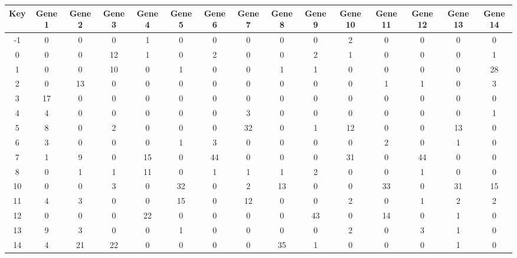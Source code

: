 \begin{tabular}{|c|c|c|c|c|c|c|c|c|c|c|c|c|c|c|}
\hline
Key & Gene 1 & Gene 2 & Gene 3 & Gene 4 & Gene 5 & Gene 6 & Gene 7 & Gene 8 & Gene 9 & Gene 10 & Gene 11 & Gene 12 & Gene 13 & Gene 14 \\
\hline
-1 & 0 & 0 & 0 & 1 & 0 & 0 & 0 & 0 & 0 & 2 & 0 & 0 & 0 & 0 \\
0 & 0 & 0 & 12 & 1 & 0 & 2 & 0 & 0 & 2 & 1 & 0 & 0 & 0 & 1 \\
1 & 0 & 0 & 10 & 0 & 1 & 0 & 0 & 1 & 1 & 0 & 0 & 0 & 0 & 28 \\
2 & 0 & 13 & 0 & 0 & 0 & 0 & 0 & 0 & 0 & 0 & 1 & 1 & 0 & 3 \\
3 & 17 & 0 & 0 & 0 & 0 & 0 & 0 & 0 & 0 & 0 & 0 & 0 & 0 & 0 \\
4 & 4 & 0 & 0 & 0 & 0 & 0 & 3 & 0 & 0 & 0 & 0 & 0 & 0 & 1 \\
5 & 8 & 0 & 2 & 0 & 0 & 0 & 32 & 0 & 1 & 12 & 0 & 0 & 13 & 0 \\
6 & 3 & 0 & 0 & 0 & 1 & 3 & 0 & 0 & 0 & 0 & 2 & 0 & 1 & 0 \\
7 & 1 & 9 & 0 & 15 & 0 & 44 & 0 & 0 & 0 & 31 & 0 & 44 & 0 & 0 \\
8 & 0 & 1 & 1 & 11 & 0 & 1 & 1 & 1 & 2 & 0 & 0 & 1 & 0 & 0 \\
10 & 0 & 0 & 3 & 0 & 32 & 0 & 2 & 13 & 0 & 0 & 33 & 0 & 31 & 15 \\
11 & 4 & 3 & 0 & 0 & 15 & 0 & 12 & 0 & 0 & 2 & 0 & 1 & 2 & 2 \\
12 & 0 & 0 & 0 & 22 & 0 & 0 & 0 & 0 & 43 & 0 & 14 & 0 & 1 & 0 \\
13 & 9 & 3 & 0 & 0 & 1 & 0 & 0 & 0 & 0 & 2 & 0 & 3 & 1 & 0 \\
14 & 4 & 21 & 22 & 0 & 0 & 0 & 0 & 35 & 1 & 0 & 0 & 0 & 1 & 0 \\
\hline
\end{tabular}